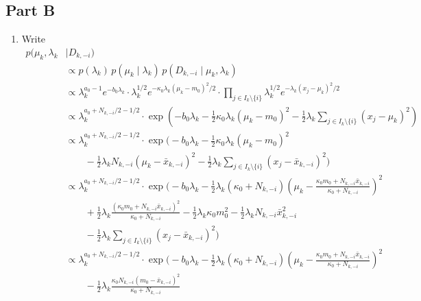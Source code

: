\documentclass[12pt]{article}
\begin{document}
\subsection*{Part B}
\begin{enumerate}[label=(\alph*), resume]
    \item Write \begin{align*}
        p(\mu_k, \lambda_k &\mid D_{k, -i}) \\
            &\propto p(\lambda_k)\, p(\mu_k\mid \lambda_k)\, p(D_{k, -i} \mid \mu_k, \lambda_k) \\
            &\propto \lambda_k^{a_0 - 1} e^{-b_0\lambda_k}\cdot \lambda_k^{1 /2} e^{-\kappa_0\lambda_k(\mu_k - m_0)^2 /2}
                \cdot \prod_{j \in I_k\setminus\{i\}} \lambda_k^{1 /2} e^{-\lambda_k(x_j - \mu_k)^2 /2} \\
            &\propto \lambda_k^{a_0 + N_{k, -i}/2 - 1 /2}
                \cdot \exp\left(-b_0\lambda_k -\frac{1}{2}\kappa_0\lambda_k(\mu_k - m_0)^2 -\frac{1}{2}\lambda_k\sum_{j \in I_k\setminus\{i\}}(x_j - \mu_k)^2\right) \\
            &\propto \lambda_k^{a_0 + N_{k, -i}/2 - 1 /2}
                \cdot \exp\Bigg(-b_0\lambda_k -\frac{1}{2}\kappa_0\lambda_k(\mu_k - m_0)^2 \\
                &\qquad -\frac{1}{2}\lambda_kN_{k, -i}(\mu_k - \bar{x}_{k, -i})^2  -\frac{1}{2}\lambda_k\sum_{j \in I_k\setminus\{i\}}(x_j - \bar{x}_{k, -i})^2\Bigg) \\
            &\propto \lambda_k^{a_0 + N_{k, -i}/2 - 1 /2}
                \cdot \exp\Bigg(-b_0\lambda_k -\frac{1}{2}\lambda_k(\kappa_0 + N_{k, -i})\left(\mu_k - \frac{\kappa_0m_0 + N_{k, -i}\bar{x}_{k, -i}}{\kappa_0 + N_{k, -i}}\right)^2 \\
                    &\qquad +\frac{1}{2}\lambda_k \frac{(\kappa_0m_0 + N_{k, -i}\bar{x}_{k, -i})^2}{\kappa_0 + N_{k, -i}}
                        -\frac{1}{2}\lambda_k\kappa_0 m_0^2 -\frac{1}{2}\lambda_kN_{k, -i}\bar{x}_{k, -i}^2 \\
                    &\qquad -\frac{1}{2}\lambda_k\sum_{j \in I_k\setminus\{i\}}(x_j - \bar{x}_{k, -i})^2\Bigg) \\
            &\propto \lambda_k^{a_0 + N_{k, -i}/2 - 1 /2}
                \cdot \exp\Bigg(-b_0\lambda_k -\frac{1}{2}\lambda_k(\kappa_0 + N_{k, -i})\left(\mu_k - \frac{\kappa_0m_0 + N_{k, -i}\bar{x}_{k, -i}}{\kappa_0 + N_{k, -i}}\right)^2 \\
                    &\qquad -\frac{1}{2}\lambda_k \frac{\kappa_0N_{k, -i}(m_0 - \bar{x}_{k, -i})^2}{\kappa_0 + N_{k, -i}}

\end{align*}
\end{enumerate}
\end{document}
